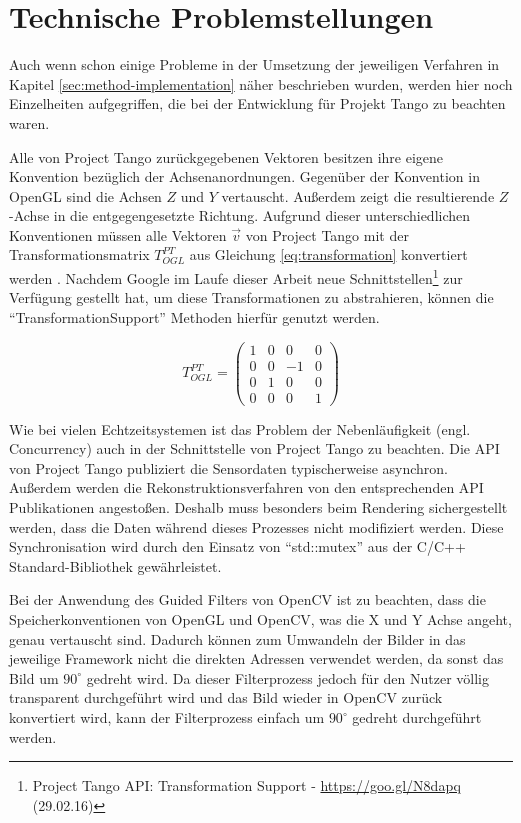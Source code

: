 \section{Technische Problemstellungen}

Auch wenn schon einige Probleme in der Umsetzung der jeweiligen Verfahren in Kapitel \ref{sec:method-implementation} näher beschrieben wurden, werden hier noch Einzelheiten aufgegriffen, die bei der Entwicklung für Projekt Tango zu beachten waren. 

Alle von Project Tango zurückgegebenen Vektoren besitzen ihre eigene Konvention bezüglich der Achsenanordnungen. Gegenüber der Konvention in OpenGL sind die Achsen \(Z\) und \(Y\) vertauscht. Außerdem zeigt die resultierende \(Z\)-Achse in die entgegengesetzte Richtung. Aufgrund dieser unterschiedlichen Konventionen müssen alle Vektoren \(\vec{v}\) von Project Tango mit der Transformationsmatrix \(T_{OGL}^{PT}\) aus Gleichung \ref{eq:transformation} konvertiert werden \citep{Proje15:online}. Nachdem Google im Laufe dieser Arbeit neue Schnittstellen\footnote{Project Tango API: Transformation Support - \url{https://goo.gl/N8dapq} (29.02.16)} zur Verfügung gestellt hat, um diese Transformationen zu abstrahieren, können die \enquote{TransformationSupport} Methoden hierfür genutzt werden.

\begin{equation} \label{eq:transformation}
T_{OGL}^{PT} =\left( \begin{matrix} 1&0&0&0\\0&0&-1&0\\0&1&0&0\\0&0&0&1 \end{matrix} \right)
\end{equation}

Wie bei vielen Echtzeitsystemen ist das Problem der Nebenläufigkeit (engl. Concurrency) auch in der Schnittstelle von Project Tango zu beachten. Die API von Project Tango publiziert die Sensordaten typischerweise asynchron. Außerdem werden die Rekonstruktionsverfahren von den entsprechenden API Publikationen angestoßen. Deshalb muss besonders beim Rendering sichergestellt werden, dass die Daten während dieses Prozesses nicht modifiziert werden. Diese Synchronisation wird durch den Einsatz von \enquote{std::mutex} aus der C/C++ Standard-Bibliothek gewährleistet. 

Bei der Anwendung des Guided Filters von OpenCV ist zu beachten, dass die  Speicherkonventionen von OpenGL und OpenCV, was die X und Y Achse angeht, genau vertauscht sind. Dadurch können zum Umwandeln der Bilder in das jeweilige Framework nicht die direkten Adressen verwendet werden, da sonst das Bild um \(90^{\circ}\) gedreht wird. Da dieser Filterprozess jedoch für den Nutzer völlig transparent durchgeführt wird und das Bild wieder in OpenCV zurück konvertiert wird, kann der Filterprozess einfach um \(90^{\circ}\) gedreht durchgeführt werden.
